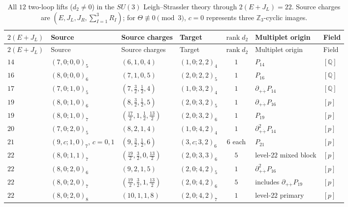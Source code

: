\documentclass[11pt]{article}
\numberwithin{equation}{section}
\numberwithin{figure}{section}
\numberwithin{table}{section}
\begin{document}
{\footnotesize\renewcommand{\arraystretch}{1.26}\setlength{\tabcolsep}{3.5pt}
\begin{xltabular}{\linewidth}{|l|l|l|l|c|>{\raggedright\arraybackslash}X|l|}
\caption{All $12$ two-loop lifts ($d_2\ne0$) in the $SU(3)$ Leigh--Strassler theory through $2(E+J_L)=22$. Source charges are $(E,J_L,J_R,\sum_{I=1}^3R_I)$; for $\Theta\not\equiv0\pmod3$, $c=0$ represents three $\mathbb Z_3$-cyclic images.}\label{local-ch9-ls-lifts}\\
\hline
$2(E+J_L)$ & Source & Source charges & Target & $\operatorname{rank}d_2$ & Multiplet origin & Field\\
\hline\endfirsthead
\hline
$2(E+J_L)$ & Source & Source charges & Target & $\operatorname{rank}d_2$ & Multiplet origin & Field\\
\hline\endhead
$14$ & $(7,0;0,0)_5$ & $(6,1,0,4)$ & $(1,0;2,2)_4$ & $1$ & $P_{14}$ & $[\mathbb Q]$\\
\hline
$16$ & $(8,0;0,0)_6$ & $(7,1,0,5)$ & $(2,0;2,2)_5$ & $1$ & $P_{16}$ & $[\mathbb Q]$\\
\hline
$17$ & $(7,0;1,0)_5$ & $(7,\tfrac32,\tfrac12,4)$ & $(1,0;3,2)_4$ & $1$ & $\partial_{+\dot+}P_{14}$ & $[\mathbb Q]$\\
\hline
$19$ & $(8,0;1,0)_6$ & $(8,\tfrac32,\tfrac12,5)$ & $(2,0;3,2)_5$ & $1$ & $\partial_{+\dot+}P_{16}$ & $[p]$\\
\hline
$19$ & $(8,0;1,0)_7$ & $(\tfrac{17}2,1,\tfrac12,\tfrac{13}2)$ & $(2,0;3,2)_6$ & $1$ & $P_{19}$ & $[p]$\\
\hline
$20$ & $(7,0;2,0)_5$ & $(8,2,1,4)$ & $(1,0;4,2)_4$ & $1$ & $\partial_{+\dot+}^2P_{14}$ & $[p]$\\
\hline
$21$ & $(9,c;1,0)_7$, $c=0,1$ & $(9,\tfrac32,\tfrac12,6)$ & $(3,c;3,2)_6$ & $6$ each & $P_{21}$ & $[p]$\\
\hline
$22$ & $(8,0;1,1)_7$ & $(\tfrac{19}2,\tfrac32,0,\tfrac{13}2)$ & $(2,0;3,3)_6$ & $5$ & level-$22$ mixed block & $[p]$\\
\hline
$22$ & $(8,0;2,0)_6$ & $(9,2,1,5)$ & $(2,0;4,2)_5$ & $1$ & $\partial_{+\dot+}^2P_{16}$ & $[p]$\\
\hline
$22$ & $(8,0;2,0)_7$ & $(\tfrac{19}2,\tfrac32,1,\tfrac{13}2)$ & $(2,0;4,2)_6$ & $5$ & includes $\partial_{+\dot+}P_{19}$ & $[p]$\\
\hline
$22$ & $(8,0;2,0)_8$ & $(10,1,1,8)$ & $(2,0;4,2)_7$ & $1$ & level-$22$ primary & $[p]$\\
\hline
\end{xltabular}}
\end{document}
